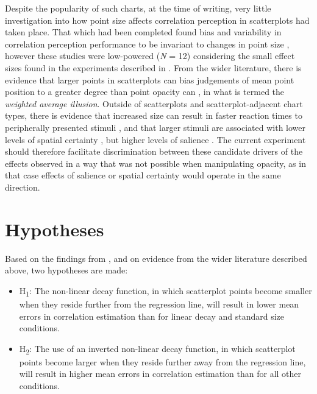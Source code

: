 \documentclass[../main.tex]{subfiles}
\begin{document}
Despite the popularity of such charts, at the time of writing, very
little investigation into how point size affects correlation perception
in scatterplots had taken place. That which had been completed found
bias and variability in correlation perception performance to be
invariant to changes in point size \cite{rensink_2012, rensink_2014},
however these studies were low-powered (\emph{N} = 12) considering the
small effect sizes found in the experiments described in
. From the wider literature, there is
evidence that larger points in scatterplots can bias judgements of mean
point position to a greater degree than point opacity can
\cite{hong_2022}, in what is termed the \emph{weighted average
illusion}. Outside of scatterplots and scatterplot-adjacent chart types,
there is evidence that increased size can result in faster reaction
times to peripherally presented stimuli \cite{grice_1983}, and that
larger stimuli are associated with lower levels of spatial certainty
\cite{alais_2004}, but higher levels of salience \cite{healey_2012}. The
current experiment should therefore facilitate discrimination between
these candidate drivers of the effects observed in a way that was not
possible when manipulating opacity, as in that case effects of salience
or spatial certainty would operate in the same direction.

\section{Hypotheses}\label{hypotheses}

Based on the findings from , and on
evidence from the wider literature described above, two hypotheses are
made:

\begin{itemize}
\tightlist
\item
  H\textsubscript{1}: The non-linear decay function, in which
  scatterplot points become smaller when they reside further from the
  regression line, will result in lower mean errors in correlation
  estimation than for linear decay and standard size conditions.
\item
  H\textsubscript{2}: The use of an inverted non-linear decay function,
  in which scatterplot points become larger when they reside further
  away from the regression line, will result in higher mean errors in
  correlation estimation than for all other conditions.
\end{itemize}
\end{document}
